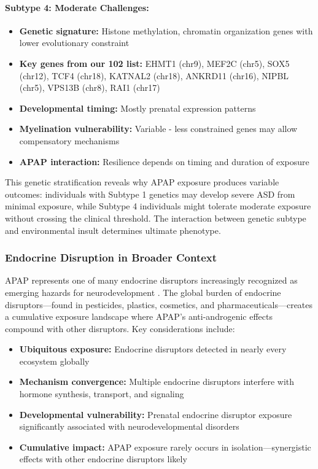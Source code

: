 \documentclass[11pt]{article}
\let\oldsubsubsection\subsubsection
\renewcommand{\subsubsection}[1]{\oldsubsubsection{#1}\setlength{\leftskip}{1.5em}}
\begin{document}
\paragraph{Subtype 4: Moderate Challenges:}
\begin{itemize}
\item \textbf{Genetic signature:} Histone methylation, chromatin organization genes with lower evolutionary constraint
\item \textbf{Key genes from our 102 list:} EHMT1 (chr9), MEF2C (chr5), SOX5 (chr12), TCF4 (chr18), KATNAL2 (chr18), ANKRD11 (chr16), NIPBL (chr5), VPS13B (chr8), RAI1 (chr17)
\item \textbf{Developmental timing:} Mostly prenatal expression patterns
\item \textbf{Myelination vulnerability:} Variable - less constrained genes may allow compensatory mechanisms
\item \textbf{APAP interaction:} Resilience depends on timing and duration of exposure
\end{itemize} 

This genetic stratification reveals why APAP exposure produces variable outcomes: individuals with Subtype 1 genetics may develop severe ASD from minimal exposure, while Subtype 4 individuals might tolerate moderate exposure without crossing the clinical threshold. The interaction between genetic subtype and environmental insult determines ultimate phenotype.

\subsubsection{Endocrine Disruption in Broader Context}

APAP represents one of many endocrine disruptors increasingly recognized as emerging hazards for neurodevelopment \citep{klingelhofer2025}. The global burden of endocrine disruptors—found in pesticides, plastics, cosmetics, and pharmaceuticals—creates a cumulative exposure landscape where APAP's anti-androgenic effects compound with other disruptors. Key considerations include:

\begin{itemize}
\item \textbf{Ubiquitous exposure:} Endocrine disruptors detected in nearly every ecosystem globally
\item \textbf{Mechanism convergence:} Multiple endocrine disruptors interfere with hormone synthesis, transport, and signaling
\item \textbf{Developmental vulnerability:} Prenatal endocrine disruptor exposure significantly associated with neurodevelopmental disorders
\item \textbf{Cumulative impact:} APAP exposure rarely occurs in isolation—synergistic effects with other endocrine disruptors likely
\end{itemize}
\end{document}
